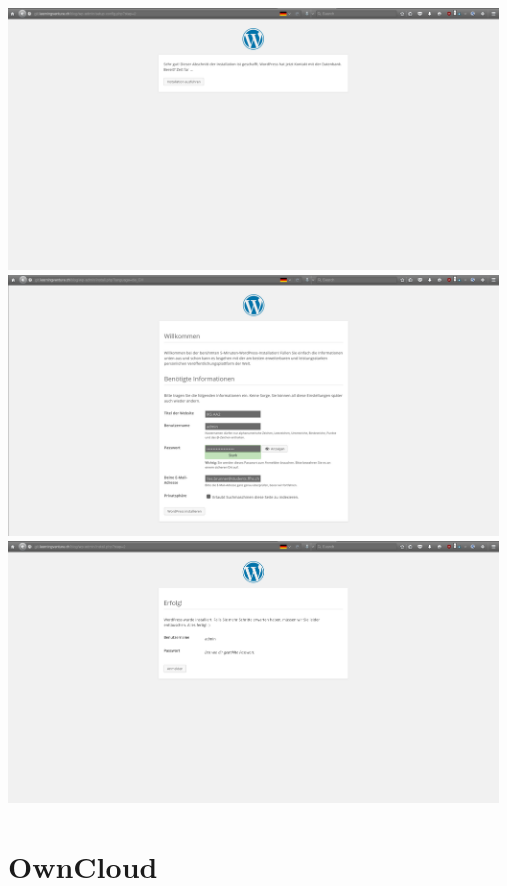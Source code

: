 \documentclass{article}
\begin{document}
	\newline
	\includegraphics[width=13cm]{../Pics/37-wordpress-databas_ok}
	\newline
	\includegraphics[width=13cm]{../Pics/38-wordpress-angaben}
	\newline
	\includegraphics[width=13cm]{../Pics/39-wordpress-install_success}
	\newline
	\section{OwnCloud}
\end{document}
